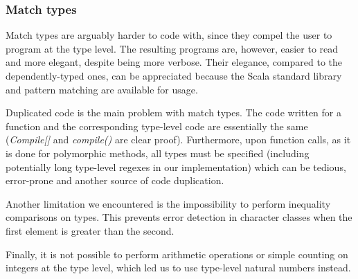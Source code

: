 \subsubsection{Match types}

Match types are arguably harder to code with, since they compel the user to program at the type level. The resulting programs are, however, easier to read and more elegant, despite being more verbose. Their elegance, compared to the dependently-typed ones, can be appreciated because the Scala standard library and pattern matching are available for usage. 

Duplicated code is the main problem with match types. The code written for a function and the corresponding type-level code are essentially the same (\textit{Compile[]} and \textit{compile()} are clear proof). Furthermore, upon function calls, as it is done for polymorphic methods, all types must be specified (including potentially long type-level regexes in our implementation) which can be tedious, error-prone and another source of code duplication.

Another limitation we encountered is the impossibility to perform inequality comparisons on types. This prevents error detection in character classes when the first element is greater than the second.

Finally, it is not possible to perform arithmetic operations or simple counting on integers at the type level, which led us to use type-level natural numbers instead.